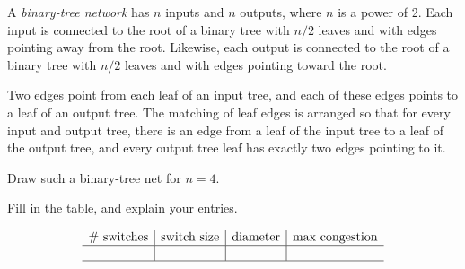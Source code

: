 \begin{problem}
A \emph{binary-tree network} has $n$ inputs and $n$ outputs, where $n$ is
a power of 2.  Each input is connected to the root of a binary tree with
$n/2$ leaves and with edges pointing away from the root.  Likewise, each
output is connected to the root of a binary tree with $n/2$ leaves and
with edges pointing toward the root.

Two edges point from each leaf of an input tree, and each of these edges
points to a leaf of an output tree.  The matching of leaf edges is
arranged so that for every input and output tree, there is an edge from a
leaf of the input tree to a leaf of the output tree, and every output tree
leaf has exactly two edges pointing to it.

\bparts
\ppart Draw such a binary-tree net for $n=4$.

\begin{solution}


\end{solution}


\ppart Fill in the table, and explain your entries.

{\large
\[
\begin{array}{c|c|c|c}
\text{\# switches} &
\text{switch size} &
\text{diameter} &
\text{max congestion} \\ \hline
&&&\\ \hline
\end{array}
\]
}

\begin{solution}

{\large
\[
\begin{array}{c|c|c|c}
\text{\# switches} &
\text{switch size} &
\text{diameter} &
\text{max congestion} \\ \hline
2n(n-1)& 1 \times 2, 2 \times 1 & 1+ 2\log n & 1\\ \hline
\end{array}
\]

\end{solution}

\end{problem}
